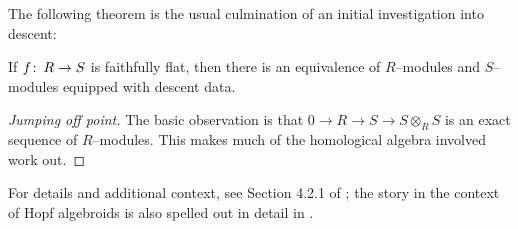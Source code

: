 The following theorem is the usual culmination of an initial investigation into descent:
\begin{theorem}[Grothendieck]
If $f\colon\thinspace R \to S$ is faithfully flat, then there is an equivalence of $R$--modules and $S$--modules equipped with descent data.
\end{theorem}
\begin{proof}[Jumping off point]
The basic observation is that $0 \to R \to S \to S \otimes_R S$ is an exact sequence of $R$--modules.  This makes much of the homological algebra involved work out.
\end{proof}

For details and additional context, see Section 4.2.1 of \cite{Vistoli}; the story in the context of Hopf algebroids is also spelled out in detail in \cite{Miller}.  

